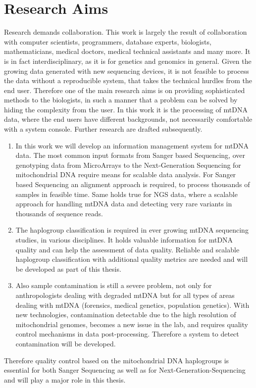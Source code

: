 \section{Research Aims}
Research demands collaboration. This work is largely the result of collaboration with computer scientists, programmers, database experts, biologists, mathematicians, medical doctors, medical technical assistants and many more. It is in fact interdisciplinary, as it is for genetics and genomics in general. Given the growing data generated with new sequencing devices, it is not feasible to process the data without a reproducible system, that takes the technical hurdles from the end user. Therefore one of the main research aims is on providing sophisticated methods to the biologists, in such a manner that a problem can be solved by hiding the complexity from the user. In this work it is the processing of mtDNA data, where the end users have different backgrounds, not necessarily comfortable with a system console. Further research are drafted subsequently.
\begin{enumerate}
\item
In this work we will develop an information management system for mtDNA data. 
The most common input formats from Sanger based Sequencing, over genotyping data from MicroArrays to the Next-Generation Sequencing for mitochondrial DNA require means for scalable data analysis. 
For Sanger based Sequencing an alignment approach is required, to process thousands of samples in feasible time. Same holds true for NGS data, where a scalable approach for handling mtDNA data and detecting very rare variants in thousands of sequence reads.
\item The haplogroup classification is required in ever growing mtDNA sequencing studies, in various disciplines. It holds valuable information for mtDNA quality and can help the assessment of data quality. Reliable and scalable haplogroup classification with additional quality metrics are needed and will be developed as part of this thesis.
\item Also sample contamination is still a severe problem, not only for anthropologists dealing with degraded mtDNA but for all types of areas dealing with mtDNA (forensics, medical genetics, population genetics). With new technologies, contamination detectable due to the high resolution of mitochondrial genomes, becomes a new issue in the lab, and requires quality control mechanisms in data post-processing. Therefore a system to detect contamination will be developed. 
\end{enumerate}
Therefore quality control based on the mitochondrial DNA haplogroups is essential for both Sanger Sequencing as well as for Next-Generation-Sequencing and will play a major role in this thesis.

